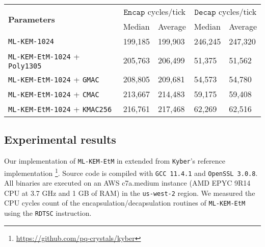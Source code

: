 \documentclass[runningheads]{llncs}
\newcommand{\keygen}{\texttt{KeyGen}}
\newcommand{\encap}{\texttt{Encap}}
\newcommand{\decap}{\texttt{Decap}}
\newcommand{\pk}{\texttt{pk}}
\newcommand{\sk}{\texttt{sk}}
\begin{document}
\begin{table}[h]
    \begin{tabular}[t]{|p{15em}|p{5em}|p{5em}|p{5em}|p{5em}|}
        \hline
        \multirow{2}{*}{\bf Parameters} 
        & \multicolumn{2}{|c|}{$\encap$ cycles/tick} 
        & \multicolumn{2}{|c|}{$\decap$ cycles/tick} \\
        \cline{2-5}
        & Median & Average & Median & Average \\
        \hline
        \texttt{ML-KEM-1024} & 199,185 & 199,903 & 246,245 & 247,320 \\
        \hline
        \texttt{ML-KEM-EtM-1024} + \texttt{Poly1305} & 205,763 & 206,499 & 51,375 & 51,562 \\
        \hline
        \texttt{ML-KEM-EtM-1024} + \texttt{GMAC} & 208,805 & 209,681 & 54,573 & 54,780 \\
        \hline
        \texttt{ML-KEM-EtM-1024} + \texttt{CMAC} & 213,667 & 214,483 & 59,175 & 59,408 \\
        \hline
        \texttt{ML-KEM-EtM-1024} + \texttt{KMAC256} & 216,761 & 217,468 & 62,269 & 62,516 \\
        \hline
    \end{tabular}
\end{table}


\subsection{Experimental results}
Our implementation of \texttt{ML-KEM-EtM} in extended from \texttt{Kyber}'s reference implementation \footnote{\url{https://github.com/pq-crystals/kyber}}. Source code is compiled with \texttt{GCC 11.4.1} and \texttt{OpenSSL 3.0.8}. All binaries are executed on an AWS c7a.medium instance (AMD EPYC 9R14 CPU at 3.7 GHz and 1 GB of RAM) in the \texttt{us-west-2} region. We measured the CPU cycles count of the encapsulation/decapsulation routines of \texttt{ML-KEM-EtM} using the \texttt{RDTSC} instruction. 
\end{document}
